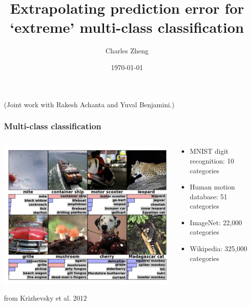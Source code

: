 \documentclass{beamer}
\title[Multi-class error]{Extrapolating prediction error for `extreme' multi-class classification}
\author{Charles Zheng} %
\institute[Stanford] %
{Stanford University}
\date{\today} %
\begin{document}
\begin{frame}
\titlepage %
(Joint work with Rakesh Achanta and Yuval Benjamini.)
\end{frame}


\begin{frame}
\frametitle{Multi-class classification}
\begin{columns}
\begin{column}{0.5\textwidth}
\begin{center}
\includegraphics[scale = 0.4]{imagenet-fig4l.png}
\end{center}
\vspace{0.2in}
\tiny{from Krizhevsky et al. 2012}
\end{column}
\begin{column}{0.5\textwidth}
\begin{itemize}
\item MNIST digit recognition: 10 categories
\item Human motion database: 51 categories
\item ImageNet: 22,000 categories
\item Wikipedia: 325,000 categories
\end{itemize}
\end{column}
\end{columns}
\end{frame}
\end{document}
